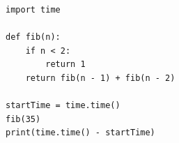 \documentclass[a4paper, 12p]{book}
\begin{document}
\begin{lstlisting}
import time

def fib(n):
    if n < 2:
        return 1
    return fib(n - 1) + fib(n - 2)

startTime = time.time()
fib(35)
print(time.time() - startTime)
\end{lstlisting}

\newpage %

\clearpage
{}


\end{document}

